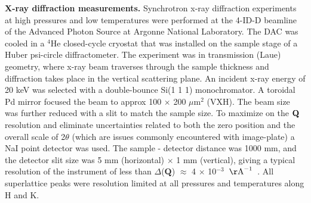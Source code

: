 \documentclass[preprint,superscriptaddress,amsmath,amssymb,aps,prl]{revtex4-1}
\begin{document}
\textbf{X-ray diffraction measurements.} Synchrotron x-ray diffraction experiments at high pressures and low temperatures were performed at the 4-ID-D beamline of the Advanced Photon Source at Argonne National Laboratory. The DAC was cooled in a $^4$He closed-cycle cryostat that was installed on the sample stage of a Huber psi-circle diffractometer. The experiment was in transmission (Laue) geometry, where x-ray beam traverses through the sample thickness and diffraction takes place in the vertical scattering plane. An incident x-ray energy of 20 keV was selected with a double-bounce Si(1 1 1) monochromator. A toroidal Pd mirror focused the beam to approx 100 $\times$ 200 $\mu$m$^2$ (VXH). The beam size was further reduced with a slit to match the sample size. To maximize on the ${\bf Q}$ resolution and eliminate uncertainties related to both the zero position and the overall scale of 2$\theta$ (which are issues commonly encountered with image-plate) a NaI point detector was used. The sample - detector distance was 1000 mm, and the detector slit size was 5 mm (horizontal) $\times$ 1 mm (vertical), giving a typical resolution of the instrument of less than $\Delta$($\mathbf{Q}$) $\approx$ 4 $\times$ 10$^{-3}$~${\rm \AA}^{-1}$~\cite{Yejun2010}. All superlattice peaks were resolution limited at all pressures and temperatures along H and K.
\end{document}
